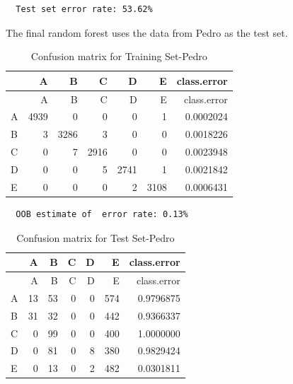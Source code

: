\documentclass[12pt,twoside]{reedthesis}
\begin{document}
  \begin{verbatim}
  Test set error rate: 53.62%
  \end{verbatim}
  
  \newpage
  
  The final random forest uses the data from Pedro as the test set.
  
  \begin{Shaded}
  \begin{Highlighting}[]
  \NormalTok{(}\NormalTok{)}
  
  \StringTok{ }\NormalTok{wl2[wl2$user_name ==}\StringTok{ }\NormalTok{subjects[}\NormalTok{], ]}
  \StringTok{ }\NormalTok{wl2[wl2$user_name !=}\StringTok{ }\NormalTok{subjects[}\NormalTok{], ]}
  \StringTok{ }\NormalTok{(} \NormalTok{OtherSubs6[, }\NormalTok{:}\NormalTok{], } 
                                  \NormalTok{Sub6[, }\NormalTok{:}\NormalTok{],}
                                  
                                  \NormalTok{)}
  \end{Highlighting}
  \end{Shaded}
  
  \begin{longtable}[c]{@{}lrrrrrr@{}}
  \caption{Confusion matrix for Training Set-Pedro}\tabularnewline
  \toprule
  & A & B & C & D & E & class.error\tabularnewline
  \midrule
  \endfirsthead
  \toprule
  & A & B & C & D & E & class.error\tabularnewline
  \midrule
  \endhead
  A & 4939 & 0 & 0 & 0 & 1 & 0.0002024\tabularnewline
  B & 3 & 3286 & 3 & 0 & 0 & 0.0018226\tabularnewline
  C & 0 & 7 & 2916 & 0 & 0 & 0.0023948\tabularnewline
  D & 0 & 0 & 5 & 2741 & 1 & 0.0021842\tabularnewline
  E & 0 & 0 & 0 & 2 & 3108 & 0.0006431\tabularnewline
  \bottomrule
  \end{longtable}
  
  \begin{verbatim}
  OOB estimate of  error rate: 0.13%
  \end{verbatim}
  
  \begin{longtable}[c]{@{}lrrrrrr@{}}
  \caption{Confusion matrix for Test Set-Pedro}\tabularnewline
  \toprule
  & A & B & C & D & E & class.error\tabularnewline
  \midrule
  \endfirsthead
  \toprule
  & A & B & C & D & E & class.error\tabularnewline
  \midrule
  \endhead
  A & 13 & 53 & 0 & 0 & 574 & 0.9796875\tabularnewline
  B & 31 & 32 & 0 & 0 & 442 & 0.9366337\tabularnewline
  C & 0 & 99 & 0 & 0 & 400 & 1.0000000\tabularnewline
  D & 0 & 81 & 0 & 8 & 380 & 0.9829424\tabularnewline
  E & 0 & 13 & 0 & 2 & 482 & 0.0301811\tabularnewline
  \bottomrule
  \end{longtable}
  
\end{document}
